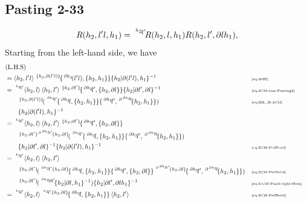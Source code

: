 \documentclass[11pt, reqno]{amsart} %
\newcommand{\act}[1]{\,\sp{#1}\!}
\theoremstyle{definition}
\theoremstyle{remark}
\numberwithin{equation}{section}
\begin{document}
\subsection{Pasting 2-33}
\[
  R(h_2,l'l,h_1) = \act{\act{h_2}l'}R(h_2,l,h_1)R(h_2,l',\partial lh_1),
\]
Starting from the left-hand side, we have
\begin{align*}
  &(\text{L.H.S}) \\
  &= \left<h_2,l'l\right>\act{\{h_2,\partial (l'l)\}}\{\act{\partial h_2}(l'l),\{h_2,h_1\}\}\{h_2|\partial(l'l),h_1\}^{-1} & &\text{\tiny \eqref{eq:defR}} \\
  &= \act{\act{h_2}l'}\left<h_2,l\right>\left<h_2,l'\right>\act{\{h_2,\partial l'\}}\{\act{\partial h_2}l',\{h_2,\partial l\}\}\{h_2|\partial l',\partial l\}^{-1} & &\text{\tiny \eqref{eq:3CM-aux-Pasting2}} \\
  &\qquad \act{\{h_2,\partial (l'l)\}}(\act{\act{\partial h_2}l'}\{\act{\partial h_2}l,\{h_2,h_1\}\}\{\act{\partial h_2}l',\act{\partial \act{\partial h_2}l}\{h_2,h_1\}\}) & &\text{\tiny \eqref{eq:HH_H-2CM}} \\
  &\qquad \{h_2|\partial(l'l),h_1\}^{-1} \\
  &= 
  \act{\act{h_2}l'}\left<h_2,l\right>\left<h_2,l'\right>\act{\{h_2,\partial l'\}}\{\act{\partial h_2}l',\{h_2,\partial l\}\} \\
  &\qquad \act{\{h_2,\partial l'\}\act{\partial \act{\partial h_2}l'}\{h_2,\partial l\}}(\act{\act{\partial h_2}l'}\{\act{\partial h_2}l,\{h_2,h_1\}\}\{\act{\partial h_2}l',\act{\partial \act{\partial h_2}l}\{h_2,h_1\}\}) \\
  &\qquad \{h_2|\partial l',\partial l\}^{-1}\{h_2|\partial(l'l),h_1\}^{-1} & &\text{\tiny \eqref{eq:2CM-Peifferid}} \\
  &= 
  \act{\act{h_2}l'}\left<h_2,l\right>\left<h_2,l'\right> \\
  &\qquad \act{\{h_2,\partial l'\}}(\act{\act{\partial h_2}l'\{h_2,\partial l\}}\{\act{\partial h_2}l,\{h_2,h_1\}\}
  \{\act{\partial h_2}l',\{h_2,\partial l\}\}
  \act{\act{\partial \act{\partial h_2}l'}\{h_2,\partial l\}}\{\act{\partial h_2}l',\act{\partial \act{\partial h_2}l}\{h_2,h_1\}\}) & &\text{\tiny \eqref{eq:2CM-Peifferid}} \\
  &\qquad \act{\{h_2,\partial l'\}}(\act{\act{\partial h_2}\partial l'}\{h_2|\partial l,h_1\}^{-1})\{h_2|\partial l',\partial lh_1\}^{-1} & &\text{\tiny \eqref{eq:3-CM-Fund-right-Hom}} \\
  &= 
  \act{\act{h_2}l'}\left<h_2,l\right>\act{\act{h_2}l'\{h_2,\partial l\}}\{\act{\partial h_2}l,\{h_2,h_1\}\}\left<h_2,l'\right> & &\text{\tiny \eqref{eq:2CM-Peifferid}} \\

\end{align*}
\end{document}
